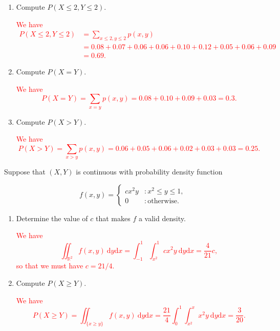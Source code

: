 \documentclass[12pt,reqno]{amsart}
\begin{document}
\medskip
\begin{enumerate}
\item Compute $P(X\leq 2, Y\leq 2)$.
    
\bigskip
\textcolor{red}{We have
	\begin{align*}
	P(X\leq 2, Y\leq 2) &= \sum_{x\leq 2, y\leq 2}p(x,y) \\
	&= 0.08 + 0.07 + 0.06 + 0.06 + 0.10 + 0.12 + 0.05 + 0.06 + 0.09 \\
	&= 0.69.
	\end{align*}}
\bigskip

\item Compute $P(X=Y)$.

\bigskip
\textcolor{red}{We have
	\[
	P(X=Y) = \sum_{x=y} p(x,y) = 0.08 + 0.10 + 0.09 + 0.03 = 0.3.
	\]}
\bigskip

\item Compute $P(X>Y)$.
    
\bigskip
\textcolor{red}{We have
	\[
	P(X>Y) = \sum_{x>y} p(x,y) = 0.06 + 0.05 + 0.06 + 0.02 + 0.03 + 0.03 = 0.25.
	\]}
\bigskip
\end{enumerate}

















\prob Suppose that $(X,Y)$ is continuous with probability density function

	\[
	f(x,y) = \begin{cases}
	cx^2 y & : x^2 \leq y \leq 1, \\
	0 & : \text{otherwise}.
	\end{cases}
	\]

\medskip
\begin{enumerate}
\item Determine the value of $c$ that makes $f$ a valid density.
    
\bigskip
\textcolor{red}{We have
	\[
	\iint_{\mathbb{R}^2} f(x,y) \ \text{d}y\text{d}x = \int_{-1}^1 \int_{x^2}^1 cx^2y \ \text{d}y\text{d}x = \frac{4}{21}c, 
	\]
so that we must have $c = 21/4$.}
\bigskip

\item Compute $P(X\geq Y)$.
    
\bigskip
\textcolor{red}{We have
	\[
	P(X\geq Y) = \iint_{\{x\geq y\}} f(x,y) \ \text{d}y\text{d}x = \frac{21}{4}\int_0^1 \int_{x^2}^x  x^2y \ \text{d}y \text{d}x = \frac{3}{20}.
	\]}
\bigskip
\end{enumerate}
\end{document}
